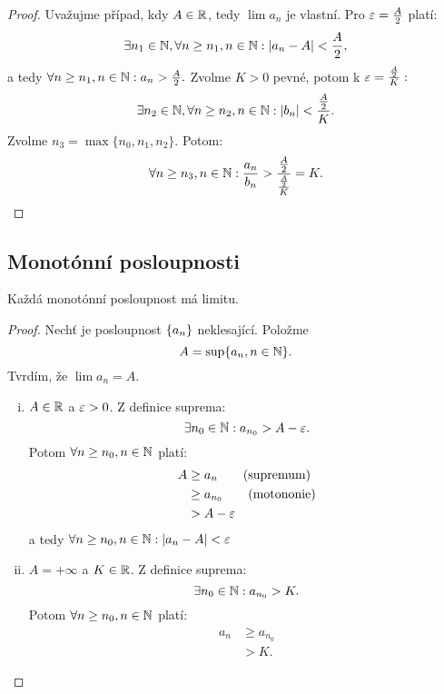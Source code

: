 \begin{proof}
    Uvažujme případ, kdy $A \in \mathbb{R}$, tedy $\lim a_n$ je vlastní.
    Pro $\varepsilon = \frac{A}{2}$ platí:
    $$\exists n_1 \in \mathbb{N}, \forall n \geq n_1, n\in\mathbb{N}: |a_n - A| < \frac{A}{2},$$
    a tedy $\forall n \geq n_1, n \in \mathbb{N}: a_n > \frac{A}{2}.$ Zvolme $K > 0$ pevné,
    potom k $\varepsilon = \frac{\frac{A}{2}}{K}:$
    $$\exists n_2 \in \mathbb{N}, \forall n \geq n_2, n\in\mathbb{N}: |b_n| < \frac{\frac{A}{2}}{K}.$$
    Zvolme $n_3 = \max \{n_0, n_1, n_2\}.$ Potom:
    $$\forall n \geq n_3, n\in\mathbb{N}: \frac{a_n}{b_n} > 
    \frac{\frac{A}{2}}{\frac{\frac{A}{2}}{K}} = K.$$
\end{proof}

\subsection{Monotónní posloupnosti}

\begin{theorem}
    \label{th:monotonniposl}
    Každá monotónní posloupnost má limitu.
\end{theorem}

\begin{proof}
    Nechť je \buno posloupnost $\left\{a_n\right\}$ neklesající. Položme
    $$A = \sup \{a_n, n\in \mathbb{N}\}.$$ Tvrdím, že $\lim a_n = A.$
    \begin{enumerate}[i.]
        \item \Necht $A \in \mathbb{R}$ a $\varepsilon > 0$. Z definice suprema:
            $$\exists n_0 \in \mathbb{N}: a_{n_0} > A - \varepsilon.$$
            Potom $\forall n \geq n_0, n\in\mathbb{N}$ platí: 
            \begin{align*}
                A &\geq a_n \tag{supremum} \\
                  &\geq a_{n_0} \tag{motononie} \\
                  &> A - \varepsilon
            \end{align*}
            a tedy $\forall n \geq n_0, n\in\mathbb{N}: |a_n - A| < \varepsilon$
        \item \Necht $A = +\infty$ a $K \in \mathbb{R}$. Z definice suprema:
            $$\exists n_0 \in \mathbb{N}: a_{n_0} > K.$$
            Potom $\forall n \geq n_0, n\in\mathbb{N}$ platí: 
            \begin{align*} 
                a_n &\geq a_{n_0} \tag{monotonie} \\
                    &>K.
            \end{align*}
    \end{enumerate}
\end{proof}

